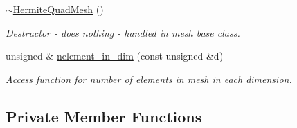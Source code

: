 \begin{DoxyCompactItemize}
\hyperlink{classoomph_1_1HermiteQuadMesh_a81f14d729df268911cd3943efc125492}{$\sim$\+Hermite\+Quad\+Mesh} ()
\begin{DoxyCompactList}\small\item\em Destructor -\/ does nothing -\/ handled in mesh base class. \end{DoxyCompactList}\item 
unsigned \& \hyperlink{classoomph_1_1HermiteQuadMesh_a06599366634a9ac89e25a0f110d0a35b}{nelement\+\_\+in\+\_\+dim} (const unsigned \&d)
\begin{DoxyCompactList}\small\item\em Access function for number of elements in mesh in each dimension. \end{DoxyCompactList}\end{DoxyCompactItemize}
\subsection*{Private Member Functions}
